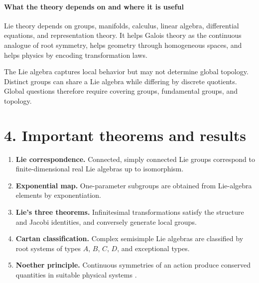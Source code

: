 \paragraph{What the theory depends on and where it is useful}
Lie theory depends on groups, manifolds, calculus, linear algebra, differential equations, and representation theory. It helps Galois theory as the continuous analogue of root symmetry, helps geometry through homogeneous spaces, and helps physics by encoding transformation laws.

The Lie algebra captures local behavior but may not determine global topology. Distinct groups can share a Lie algebra while differing by discrete quotients. Global questions therefore require covering groups, fundamental groups, and topology.

\section*{4. Important theorems and results}
\begin{enumerate}[leftmargin=*,itemsep=0.35em]
\item \textbf{Lie correspondence.} Connected, simply connected Lie groups correspond to finite-dimensional real Lie algebras up to isomorphism.

\item \textbf{Exponential map.} One-parameter subgroups are obtained from Lie-algebra elements by exponentiation.

\item \textbf{Lie's three theorems.} Infinitesimal transformations satisfy the structure and Jacobi identities, and conversely generate local groups.

\item \textbf{Cartan classification.} Complex semisimple Lie algebras are classified by root systems of types $A$, $B$, $C$, $D$, and exceptional types.

\item \textbf{Noether principle.} Continuous symmetries of an action produce conserved quantities in suitable physical systems \cite{lie_theory_ref3}.
\end{enumerate}

\theoryapplications
{}


